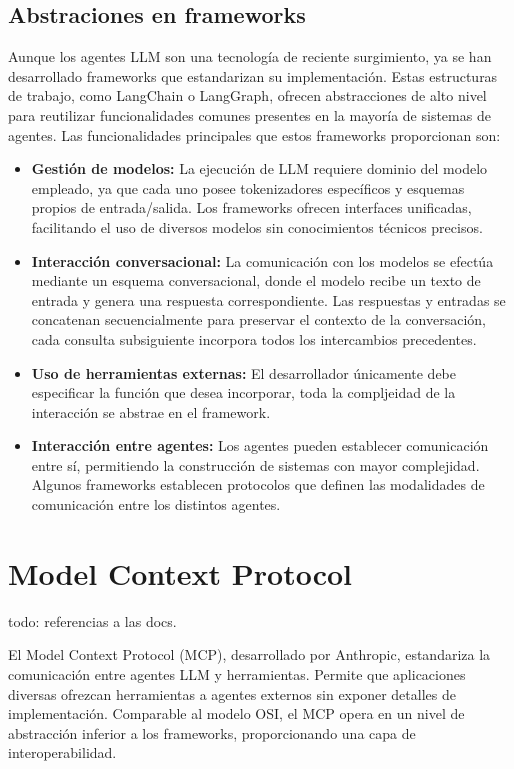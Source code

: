 \subsection{Abstraciones en frameworks}
Aunque los agentes LLM son una tecnología de reciente surgimiento, ya se han desarrollado frameworks que estandarizan su implementación. Estas estructuras de trabajo, como LangChain o LangGraph, ofrecen abstracciones de alto nivel para reutilizar funcionalidades comunes presentes en la mayoría de sistemas de agentes.
Las funcionalidades principales que estos frameworks proporcionan son:
\begin{itemize}
\item {\textbf{Gestión de modelos:}} La ejecución de LLM requiere dominio del modelo empleado, ya que cada uno posee tokenizadores específicos y esquemas propios de entrada/salida. Los frameworks ofrecen interfaces unificadas, facilitando el uso de diversos modelos sin conocimientos técnicos precisos.
\item {\textbf{Interacción conversacional:}} La comunicación con los modelos se efectúa mediante un esquema conversacional, donde el modelo recibe un texto de entrada y genera una respuesta correspondiente. Las respuestas y entradas se concatenan secuencialmente para preservar el contexto de la conversación, cada consulta subsiguiente incorpora todos los intercambios precedentes.
  \item {\textbf{Uso de herramientas externas:}} El desarrollador únicamente debe especificar la función que desea incorporar, toda la compljeidad de la interacción se abstrae en el framework.
\item {\textbf{Interacción entre agentes:}} Los agentes pueden establecer comunicación entre sí, permitiendo la construcción de sistemas con mayor complejidad. Algunos frameworks establecen protocolos que definen las modalidades de comunicación entre los distintos agentes.
\end{itemize}

\section{Model Context Protocol}
todo: referencias a las docs.

El Model Context Protocol (MCP), desarrollado por Anthropic, estandariza la comunicación entre agentes LLM y herramientas. Permite que aplicaciones diversas ofrezcan herramientas a agentes externos sin exponer detalles de implementación. Comparable al modelo OSI, el MCP opera en un nivel de abstracción inferior a los frameworks, proporcionando una capa de interoperabilidad.

